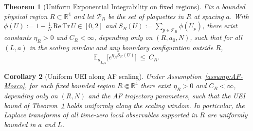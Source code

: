 \documentclass[11pt]{amsart}
\theoremstyle{plain}
\newtheorem{theorem}{Theorem}[section]
\newtheorem{corollary}[theorem]{Corollary}
\theoremstyle{definition}
\theoremstyle{remark}
\begin{document}
\begin{theorem}[Uniform Exponential Integrability on fixed regions]\label{thm:uei-fixed-region}
Fix a bounded physical region $R\subset\mathbb{R}^4$ and let $\mathcal{P}_R$ be the set of plaquettes in $R$ at spacing $a$. With $\phi(U):=1-\tfrac{1}{N}\,\mathrm{Re\,Tr}\,U\in[0,2]$ and $S_R(U):=\sum_{p\in\mathcal{P}_R}\phi(U_p)$, there exist constants $\eta_R>0$ and $C_R<\infty$, depending only on $(R,a_0,N)$, such that for all $(L,a)$ in the scaling window and any boundary configuration outside $R$,
\[
  \mathbb{E}_{\mu_{L,a}}\big[e^{\eta_R S_R(U)}\big]\ \le\ C_R.
\]
\end{theorem}
\begin{corollary}[Uniform UEI along AF scaling]\label{cor:uei-af-uniform}
Under Assumption~\ref{assump:AF-Mosco}, for each fixed bounded region $R\Subset\mathbb R^4$ there exist $\eta_R>0$ and $C_R<\infty$, depending only on $(R,N)$ and the AF trajectory parameters, such that the UEI bound of Theorem~\ref{thm:uei-fixed-region} holds uniformly along the scaling window. In particular, the Laplace transforms of all time-zero local observables supported in $R$ are uniformly bounded in $a$ and $L$.
\end{corollary}
\end{document}
